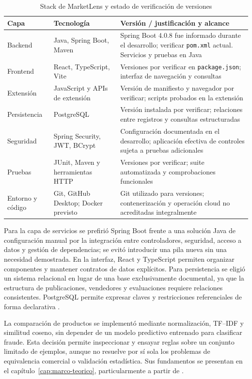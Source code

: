 \begin{table}[htbp]
\centering
\caption{Stack de MarketLens y estado de verificación de versiones}
\label{tab:ml-stack}
\small
\begin{tabularx}{\textwidth}{@{}p{}p{}X@{}}
\toprule
\textbf{Capa} & \textbf{Tecnología} & \textbf{Versión / justificación y alcance} \\
\midrule
Backend & Java, Spring Boot, Maven & Spring Boot 4.0.8 fue informado durante el desarrollo; verificar \texttt{pom.xml} actual. Servicios y pruebas en Java \\
Frontend & React, TypeScript, Vite & Versiones por verificar en \texttt{package.json}; interfaz de navegación y consultas \\
Extensión & JavaScript y APIs de extensión & Versión de manifiesto y navegador por verificar; scripts probados en la extensión \\
Persistencia & PostgreSQL & Versión instalada por verificar; relaciones entre registros y consultas estructuradas \\
Seguridad & Spring Security, JWT, BCrypt & Configuración documentada en el desarrollo; aplicación efectiva de controles sujeta a pruebas adicionales \\
Pruebas & JUnit, Maven y herramientas HTTP & Versiones por verificar; suite automatizada y comprobaciones funcionales \\
Entorno y código & Git, GitHub Desktop; Docker previsto & Git utilizado para versiones; contenerización y operación cloud no acreditadas integralmente \\
\bottomrule
\end{tabularx}
\end{table}

Para la capa de servicios se prefirió Spring Boot frente a una solución Java de configuración manual por la integración entre controladores, seguridad, acceso a datos y gestión de dependencias; se evitó introducir una pila nueva sin una necesidad demostrada. En la interfaz, React y TypeScript permiten organizar componentes y mantener contratos de datos explícitos. Para persistencia se eligió un sistema relacional en lugar de una base exclusivamente documental, ya que la estructura de publicaciones, vendedores y evaluaciones requiere relaciones consistentes. PostgreSQL permite expresar claves y restricciones referenciales de forma declarativa \citep{ml-postgresql-constraints}.

La comparación de productos se implementó mediante normalización, TF--IDF y similitud coseno, sin depender de un modelo predictivo entrenado para clasificar fraude. Esta decisión permite inspeccionar y ensayar reglas sobre un conjunto limitado de ejemplos, aunque no resuelve por sí sola los problemas de equivalencia comercial o validación estadística. Sus fundamentos se presentan en el capítulo~\ref{cap:marco-teorico}, particularmente a partir de \citet{ml-manning-2008}.

